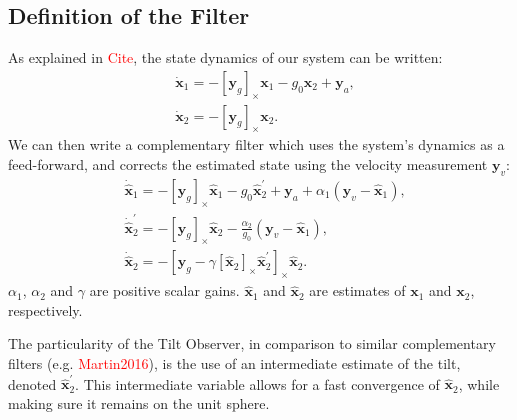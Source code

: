 \documentclass{IJCAS}
\begin{document}
\subsection{Definition of the Filter}
As explained in \textcolor{red}{Cite}, the state dynamics of our system can be written:
\begin{align} 
&\dot{\boldsymbol{x}}_{1} = -\left[\boldsymbol{y}_{g}\right]_{\times} \boldsymbol{x}_{1} - g_{0}\boldsymbol{x}_{2} + \boldsymbol{y}_{a} , \label{eq:x1_dot} \\
&\dot{\boldsymbol{x}}_{2} = -\left[\boldsymbol{y}_{g}\right]_{\times} \boldsymbol{x}_{2}. \label{eq:x2_dot}
\end{align} 
We can then write a complementary filter which uses the system's dynamics as a feed-forward, and corrects the estimated state using the velocity measurement $\boldsymbol{y}_{v}$:
\begin{align} 
& \dot{\hat{\boldsymbol{x}}}_{1}  = - \left[\boldsymbol{y}_{g}\right]_{\times}\hat{\boldsymbol{x}}_{1} - g_{0} \hat{\boldsymbol{x}}_{2}^{\prime} + \boldsymbol{y}_{a} + \alpha_{1} \left(\boldsymbol{y}_{v} - \hat{\boldsymbol{x}}_{1}\right), \\
    & \dot{\hat{\boldsymbol{x}}}_{2}^{\prime} = - \left[\boldsymbol{y}_{g}\right]_{\times} \hat{\boldsymbol{x}}_{2} - \frac{\alpha_{2}}{g_{0}} \left(\boldsymbol{y}_{v} - \hat{\boldsymbol{x}}_{1}\right), \\
    & \dot{\hat{\boldsymbol{x}}}_{2} = - \left[\boldsymbol{y}_{g} - \gamma \left[\hat{\boldsymbol{x}}_{2}\right]_{\times}\hat{\boldsymbol{x}}_{2}^{\prime}\right]_{\times} \hat{\boldsymbol{x}}_{2}.
\end{align} 
$\alpha_1$, $\alpha_2$ and $\gamma$ are positive scalar gains. $\hat{\boldsymbol{x}}_{1} $ and $\hat{\boldsymbol{x}}_{2} $ are estimates of $\boldsymbol{x}_{1} $ and $\boldsymbol{x}_{2} $, respectively. 

The particularity of the Tilt Observer, in comparison to similar complementary filters (e.g. \textcolor{red}{Martin2016}), is the use of an intermediate estimate of the tilt, denoted $\hat{\boldsymbol{x}}_{2}^{\prime}$. This intermediate variable allows for a fast convergence of $\hat{\boldsymbol{x}}_{2}$, while making sure it remains on the unit sphere. 



\end{document}
